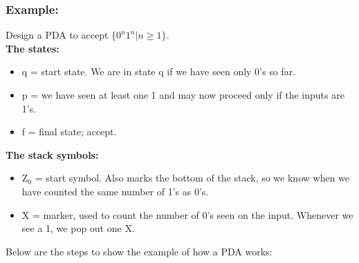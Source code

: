 \documentclass{report}
\begin{document}
\subsubsection{Example:} 
Design a PDA to accept $\{0^n1^n|n\geqslant1\}$. \\
\textbf{The states:}
\begin{itemize}
    \item q = start state. We are in state q if we have seen only 0’s so far.
    \item p = we have seen at least one 1 and may now proceed only if the inputs are 1’s.
    \item f = final state; accept.
\end{itemize}
\textbf{The stack symbols:}
\begin{itemize}
    \item Z$_0$ = start symbol. Also marks the bottom of the stack, so we know when we have counted the same number of 1’s as 0’s.
    \item X = marker, used to count the number of 0’s seen on the input. Whenever we see a 1, we pop out one X.
\end{itemize}
Below are the steps to show the example of how a PDA works:
\end{document}
